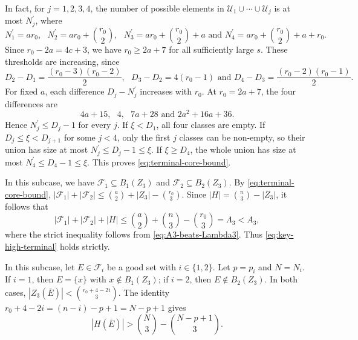 \documentclass[10pt,a4paper]{article}
\numberwithin{equation}{section}
\theoremstyle{definition}
\newcommand{\F}{\mathcal F}
\begin{document}
In fact, for $j=1,2,3,4$, the number of possible elements in $\mathcal U_1\cup\cdots\cup \mathcal U_j$ is at most $N^{\prime}_j$, where
\[
        N^{\prime}_1=ar_0,\text{ }
        N^{\prime}_2=ar_0+\binom{r_0}{2},\text{ }
        N^{\prime}_3=ar_0+\binom{r_0}{2}+a\text{ and }
        N^{\prime}_4=ar_0+\binom{r_0}{2}+a+r_0.
\]
Since $r_0-2a=4c+3$, we have $r_0\ge2a+7$ for all sufficiently large $s$.
These thresholds are increasing, since
\[
        D_2-D_1=\frac{(r_0-3)(r_0-2)}2,\text{ }
        D_3-D_2=4(r_0-1)\text{ and }
        D_4-D_3=\frac{(r_0-2)(r_0-1)}2.
\]
For fixed $a$, each difference $D_j-N^{\prime}_j$ increases with $r_0$.
At $r_0=2a+7$, the four differences are
\[
        4a+15,\text{ } 4,\text{ }7a+28\text{ and }2a^2+16a+36.
\]
Hence $N^{\prime}_j\le D_j-1$ for every $j$.
If $\xi<D_1$, all four classes are empty.
If $D_j\le\xi<D_{j+1}$ for some $j<4$, only the first $j$ classes can be non-empty, so their union has size at most $N^{\prime}_j\le D_j-1\le\xi$.
If $\xi\ge D_4$, the whole union has size at most $N^{\prime}_4\le D_4-1\le\xi$.
This proves \eqref{eq:terminal-core-bound}.

\medskip
{}
\medskip

In this subcase, we have $\F_1\subseteq B_1(Z_3)$ and $\F_2\subseteq B_2(Z_3)$.
By \eqref{eq:terminal-core-bound}, $|\F_1|+|\F_2|\le\binom a2+|Z_3|-\binom{r_0}{3}$.
Since $|H|=\binom n3-|Z_3|$, it follows that
\[
        |\F_1|+|\F_2|+|H|\le\binom a2+\binom n3-\binom{r_0}{3}=\Lambda_3<A_3,
\]
where the strict inequality follows from \eqref{eq:A3-beats-Lambda3}.
Thus \eqref{eq:key-high-terminal} holds strictly.

\medskip
{}
\medskip

In this subcase, let $E\in\F_i$ be a good set with $i\in\{1,2\}$.
Let $p=p_i$ and $N=N_i$.
If $i=1$, then $E=\{x\}$ with $x\notin B_1(Z_3)$; if $i=2$, then $E\notin B_2(Z_3)$.
In both cases, $|Z_3(\overline E)|<\binom{r_0+4-2i}{3}$.
The identity $r_0+4-2i=(n-i)-p+1=N-p+1$ gives
\begin{equation}\label{eq:good-lower-HbarE}
        |H(\overline E)|>\binom N3-\binom{N-p+1}{3}.
\end{equation}
\end{document}
